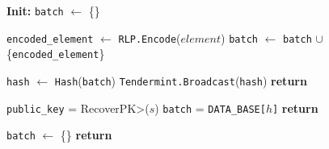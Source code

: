 \begin{figure}[t!]
  \begin{adjustbox}{minipage=[t]{\columnwidth}}
    \begin{algorithm}[H]
      \renewcommand{\thealgorithm}{Hash Collector}         
      \caption{}%
      \label{alg:collector-hash}%
      \small
      \begin{algorithmic}[1]
            \State \textbf{Init:} \texttt{batch} $\leftarrow$ \{\}
      
            \label{alg:hash_add_tx}
            			\State \texttt{encoded\_element} $\leftarrow$ \texttt{RLP.Encode}($element$)
					        \State \texttt{batch} $\leftarrow$ \texttt{batch} $\cup$ \{\texttt{encoded\_element}\}
                \EndIf
             		
             		  \State \texttt{hash} $\leftarrow$  \texttt{Hash}(\texttt{batch})
                	\State \texttt{Tendermint.Broadcast}(\texttt{hash})
              		\State {}
             	  \EndIf
                \State \textbf{return}
            \EndFunction

            \label{alg:hash_request_tx}
              \State \texttt{public\_key} = \<RecoverPK>($s$)
                \State \texttt{batch} = \texttt{DATA\_BASE[$h$]} 
              \EndIf
              \State \textbf{return}
            \EndFunction
            
            \label{alg:hash_reset}
            		\State \texttt{batch} $\leftarrow$ \{\}
                \State \textbf{return}
            \EndFunction
        \end{algorithmic}
      \end{algorithm}
	\end{adjustbox}
  \end{figure}
